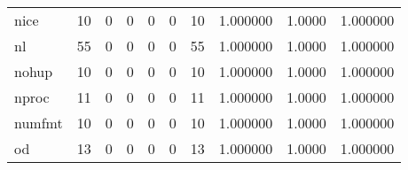 \begin{longtable}{lrrrrrrrrr}
nice      &                                       10 &                                                  0 &                                                  0 &                                                  0 &                                                  0 &                                                 10 &                                           1.000000 &                                 1.0000 &                             1.000000 \\
nl        &                                       55 &                                                  0 &                                                  0 &                                                  0 &                                                  0 &                                                 55 &                                           1.000000 &                                 1.0000 &                             1.000000 \\
nohup     &                                       10 &                                                  0 &                                                  0 &                                                  0 &                                                  0 &                                                 10 &                                           1.000000 &                                 1.0000 &                             1.000000 \\
nproc     &                                       11 &                                                  0 &                                                  0 &                                                  0 &                                                  0 &                                                 11 &                                           1.000000 &                                 1.0000 &                             1.000000 \\
numfmt    &                                       10 &                                                  0 &                                                  0 &                                                  0 &                                                  0 &                                                 10 &                                           1.000000 &                                 1.0000 &                             1.000000 \\
od        &                                       13 &                                                  0 &                                                  0 &                                                  0 &                                                  0 &                                                 13 &                                           1.000000 &                                 1.0000 &                             1.000000 \\

\end{longtable}
